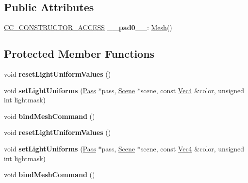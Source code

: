 \subsection*{Public Attributes}
\begin{DoxyCompactItemize}
\item 
\mbox{\label{classMesh_ab58c3e16576e29d7f98dbbe8f8ae5ef3}} 
\hyperlink{_2cocos2d_2cocos_2base_2ccConfig_8h_a25ef1314f97c35a2ed3d029b0ead6da0}{C\+C\+\_\+\+C\+O\+N\+S\+T\+R\+U\+C\+T\+O\+R\+\_\+\+A\+C\+C\+E\+SS} {\bfseries \+\_\+\+\_\+pad0\+\_\+\+\_\+}\+: \hyperlink{classMesh}{Mesh}()
\end{DoxyCompactItemize}
\subsection*{Protected Member Functions}
\begin{DoxyCompactItemize}
\item 
\mbox{\label{classMesh_a8e1ceb78f9e653b819feff99a137e914}} 
void {\bfseries reset\+Light\+Uniform\+Values} ()
\item 
\mbox{\label{classMesh_a638e8ddde36671ac172e111ee1651ea9}} 
void {\bfseries set\+Light\+Uniforms} (\hyperlink{classPass}{Pass} $\ast$pass, \hyperlink{classScene}{Scene} $\ast$scene, const \hyperlink{classVec4}{Vec4} \&color, unsigned int lightmask)
\item 
\mbox{\label{classMesh_a761ae3ff276f53aab311bbdba1b5a37e}} 
void {\bfseries bind\+Mesh\+Command} ()
\item 
\mbox{\label{classMesh_a8e1ceb78f9e653b819feff99a137e914}} 
void {\bfseries reset\+Light\+Uniform\+Values} ()
\item 
\mbox{\label{classMesh_a638e8ddde36671ac172e111ee1651ea9}} 
void {\bfseries set\+Light\+Uniforms} (\hyperlink{classPass}{Pass} $\ast$pass, \hyperlink{classScene}{Scene} $\ast$scene, const \hyperlink{classVec4}{Vec4} \&color, unsigned int lightmask)
\item 
\mbox{\label{classMesh_a761ae3ff276f53aab311bbdba1b5a37e}} 
void {\bfseries bind\+Mesh\+Command} ()
\end{DoxyCompactItemize}
